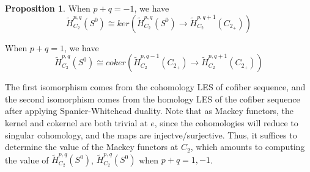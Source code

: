 \documentclass{article}
\theoremstyle{definition}
\theoremstyle{definition}
\theoremstyle{definition}
\theoremstyle{definition}
\newtheorem{proposition}{Proposition}[theorem]
\theoremstyle{definition}
\theoremstyle{definition}
\theoremstyle{definition}
\begin{document}
\begin{tcolorbox}[colback=blue!5!white,colframe=blue!30!white]
\begin{proposition}
When $p+q=-1$, we have 
\[\tilde{H}^{p,q}_{C_2}(S^0)\cong ker(\tilde{H}_{C_2}^{p,q}(S^0)\to \tilde{H}_{C_2}^{p,q+1}(C_{2_+}))\]

When $p+q=1$, we have 
\[\tilde{H}^{p,q}_{C_2}(S^0)\cong coker(\tilde{H}_{C_2}^{p,q-1}(C_{2_+})\to \tilde{H}_{C_2}^{p,q+1}(C_{2_+}))\]
\end{proposition}
\end{tcolorbox}
The first isomorphism comes from the cohomology LES of cofiber sequence, and the second isomorphism comes from the homology LES of the cofiber sequence after applying Spanier-Whitehead duality. Note that as Mackey functors, the kernel and cokernel are both trivial at $e$, since the cohomologies will reduce to singular cohomology, and the maps are injectve/surjective. Thus, it suffices to determine the value of the Mackey functors at $C_2$, which amounts to computing the value of $\tilde{H}^{p,q}_{C_2}(S^0)$, $\tilde{H}^{p,q}_{C_2}(S^0)$ when $p+q=1,-1$. 
\end{document}
